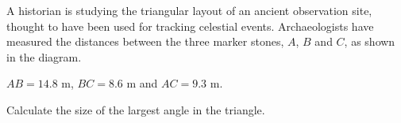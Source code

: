 \begin{question}
\noindent A historian is studying the triangular layout of an ancient observation site, thought to have been used for tracking celestial events. Archaeologists have measured the distances between the three marker stones, $A$, $B$ and $C$, as shown in the diagram.

\begin{center}
\end{center}

\noindent $AB = 14.8$ m, $BC = 8.6$ m and $AC = 9.3$ m.

\noindent Calculate the size of the largest angle in the triangle.

\vspace{5cm}

\begin{flushright}
\end{flushright}
\end{question}
